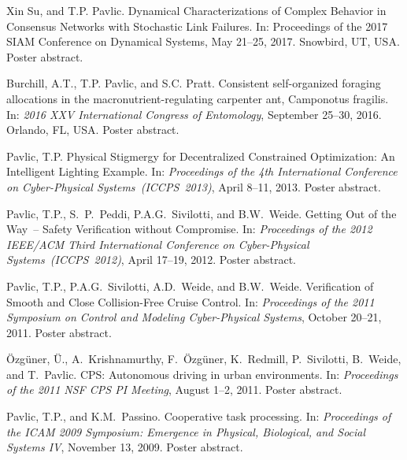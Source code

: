 \documentclass[10pt]{article}           %
\begin{document}
\begin{bibenum}
    \item Xin Su, and T.P. Pavlic. Dynamical Characterizations of
        Complex Behavior in Consensus Networks with Stochastic Link
        Failures. In: Proceedings of the 2017 SIAM Conference on
        Dynamical Systems, May 21--25, 2017. Snowbird, UT, USA. Poster
        abstract.

    \item Burchill, A.T., T.P. Pavlic, and S.C. Pratt. Consistent
        self-organized foraging allocations in the
        macronutrient-regulating carpenter ant, Camponotus fragilis. In:
        \emph{2016 XXV International Congress of
        Entomology}, September 25--30, 2016. Orlando, FL, USA. Poster
        abstract. 

    \item Pavlic, T.P. Physical Stigmergy for Decentralized Constrained
        Optimization: An Intelligent Lighting Example. In:
        \emph{Proceedings of the 4th International Conference on
        Cyber-Physical Systems~(ICCPS~2013)}, April 8--11, 2013.
        Poster abstract.

    \item Pavlic, T.P., S.~P.~Peddi, P.A.G.~Sivilotti, and B.W.~Weide.
        Getting Out of the Way~-- Safety Verification without
        Compromise. In: \emph{Proceedings of the 2012 IEEE/ACM Third
        International Conference on Cyber-Physical
        Systems~(ICCPS~2012)}, April 17--19, 2012. Poster abstract.

    \item Pavlic, T.P., P.A.G.~Sivilotti, A.D.~Weide, and B.W.~Weide.
        Verification of Smooth and Close Collision-Free Cruise Control.
        In: \emph{Proceedings of the 2011 Symposium on Control and
        Modeling Cyber-Physical Systems}, October 20--21, 2011. Poster
        abstract.

    \item {\"{O}}zg{\"{u}}ner, {\"{U}}., A.~Krishnamurthy,
        F.~{\"{O}}zg{\"{u}}ner, K.~Redmill, P.~Sivilotti, B.~Weide,
        and T.~Pavlic.
        CPS: Autonomous driving in urban environments.
        In: \emph{Proceedings of the 2011 NSF CPS PI Meeting},
        August 1--2, 2011. Poster abstract.

    \item Pavlic, T.P., and K.M.~Passino. Cooperative task
        processing. In: \emph{Proceedings of the ICAM 2009 Symposium:
        Emergence in Physical, Biological, and Social Systems IV},
        November 13, 2009. Poster abstract.

\end{bibenum}
\end{document}
